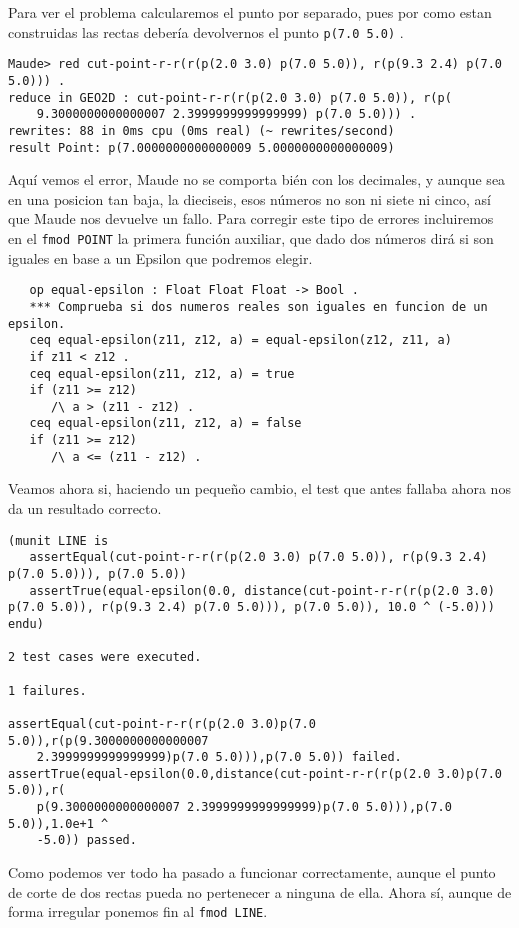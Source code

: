 Para ver el problema calcularemos el punto por separado, pues por como estan construidas las rectas debería devolvernos el punto \texttt{p(7.0 5.0)} .\par
{\codesize
\begin{verbatim}
Maude> red cut-point-r-r(r(p(2.0 3.0) p(7.0 5.0)), r(p(9.3 2.4) p(7.0 5.0))) .
reduce in GEO2D : cut-point-r-r(r(p(2.0 3.0) p(7.0 5.0)), r(p(
    9.3000000000000007 2.3999999999999999) p(7.0 5.0))) .
rewrites: 88 in 0ms cpu (0ms real) (~ rewrites/second)
result Point: p(7.0000000000000009 5.0000000000000009)
\end{verbatim}
}
Aquí vemos el error, Maude no se comporta bién con los decimales, y aunque sea en una posicion tan baja, la dieciseis, esos números no son ni siete ni cinco, así que Maude nos devuelve un fallo.
Para corregir este tipo de errores incluiremos en el \verb"fmod POINT" la primera función auxiliar, que dado dos números dirá si son iguales en base a un Epsilon que podremos elegir.\par
{\codesize
\begin{verbatim}
   op equal-epsilon : Float Float Float -> Bool .
   *** Comprueba si dos numeros reales son iguales en funcion de un epsilon.
   ceq equal-epsilon(z11, z12, a) = equal-epsilon(z12, z11, a)
   if z11 < z12 .
   ceq equal-epsilon(z11, z12, a) = true
   if (z11 >= z12) 
      /\ a > (z11 - z12) .
   ceq equal-epsilon(z11, z12, a) = false
   if (z11 >= z12) 
      /\ a <= (z11 - z12) .
\end{verbatim}   
}

Veamos ahora si, haciendo un pequeño cambio, el test que antes fallaba ahora nos da un resultado correcto.
{\codesize
\begin{verbatim}
(munit LINE is
   assertEqual(cut-point-r-r(r(p(2.0 3.0) p(7.0 5.0)), r(p(9.3 2.4) p(7.0 5.0))), p(7.0 5.0))
   assertTrue(equal-epsilon(0.0, distance(cut-point-r-r(r(p(2.0 3.0) p(7.0 5.0)), r(p(9.3 2.4) p(7.0 5.0))), p(7.0 5.0)), 10.0 ^ (-5.0)))
endu)

2 test cases were executed.

1 failures.

assertEqual(cut-point-r-r(r(p(2.0 3.0)p(7.0 5.0)),r(p(9.3000000000000007
    2.3999999999999999)p(7.0 5.0))),p(7.0 5.0)) failed.
assertTrue(equal-epsilon(0.0,distance(cut-point-r-r(r(p(2.0 3.0)p(7.0 5.0)),r(
    p(9.3000000000000007 2.3999999999999999)p(7.0 5.0))),p(7.0 5.0)),1.0e+1 ^
    -5.0)) passed.

\end{verbatim} 
}
Como podemos ver todo ha pasado a funcionar correctamente, aunque el punto de corte de dos rectas pueda no pertenecer a ninguna de ella. Ahora sí, aunque de forma irregular ponemos fin al \texttt{fmod LINE}. \par
